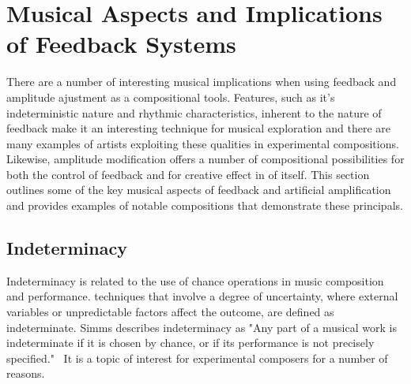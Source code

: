 \documentclass[titlepage]{scrartcl}
\begin{document}
    \section{Musical Aspects and Implications of Feedback Systems}
    There are a number of interesting musical implications when using feedback
    and amplitude ajustment as a compositional tools. Features, such as it's
    indeterministic nature and rhythmic characteristics, inherent to the nature
    of feedback make it an interesting technique for musical exploration and
    there are many examples of artists exploiting these qualities in
    experimental compositions. Likewise, amplitude modification offers a number
    of compositional possibilities for both the control of feedback and for
    creative effect in of itself. This section outlines some of the key musical
    aspects of feedback and artificial amplification and provides examples of
    notable compositions that demonstrate these principals.

    \subsection{Indeterminacy}\label{indeterminate}
    Indeterminacy is related to the use of chance operations in music
    composition and performance. techniques that involve a degree of
    uncertainty, where external variables or unpredictable factors affect the
    outcome, are defined as indeterminate. Simms describes indeterminacy as
    "Any part of a musical work is indeterminate if it is chosen by chance, or
    if its performance is not precisely
    specified."~\parencite[p.357]{simms1986mtc} It is a topic of interest for
    experimental composers for a number of reasons.
\end{document}
